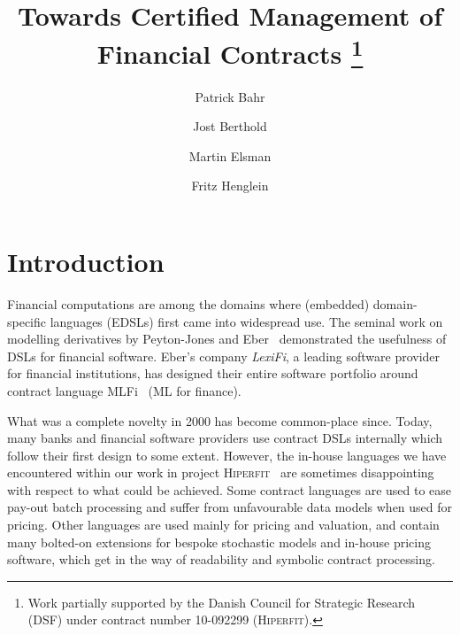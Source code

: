 \documentclass[a4paper,debug,twocolumn]{easychair}
\newcommand{\comm}[3][red]{{\small \color{#1}{$\spadesuit$#2: #3}}}
\newcommand{\jbcomment}[1]{\comm[orange]{jb}{#1}}
\theoremstyle{plain}
\begin{document}
\title{Towards Certified Management of Financial Contracts
\thanks{Work partially supported by the Danish Council for Strategic Research
(DSF) under contract number 10-092299 (\textsc{Hiperfit}).}}


\author{Patrick Bahr
    \and
        Jost Berthold 
    \and 
        Martin Elsman 
    \and 
        Fritz Henglein\\
}



\clearpage
\maketitle

\section{Introduction}

Financial computations are among the domains where (embedded)
domain-specific languages (EDSLs) first came into widespread use.  The
seminal work on modelling derivatives by Peyton-Jones and
Eber~\cite{SPJ2000} demonstrated the usefulness of DSLs for financial
software.
%
Eber's company \emph{LexiFi}, a leading software provider
for financial institutions, has designed their entire software portfolio
around contract language MLFi~\cite{MLFi} (ML for finance).

What was a complete novelty in 2000 has become common-place since.
Today, many banks and financial software providers use contract DSLs internally
which follow their first design to some extent.
However, the in-house languages we have encountered within our work in project
\textsc{Hiperfit}~\cite{TFP11Hiperfit} are sometimes disappointing with respect
to what could be achieved.
%
Some contract languages are used to ease pay-out batch processing and suffer
from unfavourable data models when used for pricing.
%
Other languages are used mainly for pricing and valuation, and contain many
bolted-on extensions for bespoke stochastic models and in-house pricing
software, which get in the way of readability and symbolic contract processing.
\jbcomment{tone down? how to substantiate it?}
\end{document}
